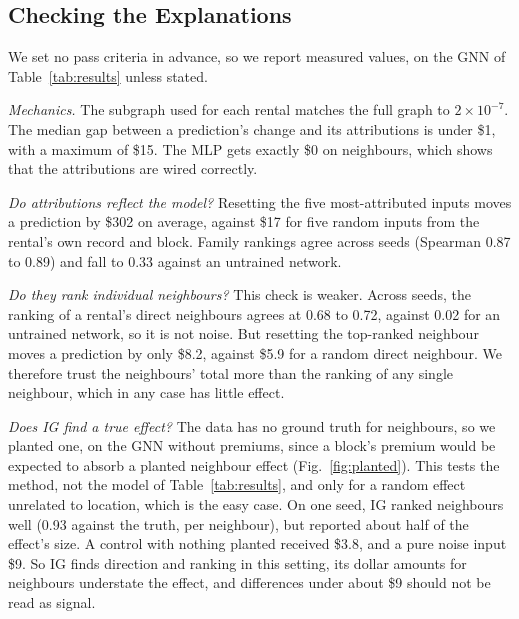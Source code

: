 \subsection{Checking the Explanations}

We set no pass criteria in advance, so we report measured values, on the GNN of Table~\ref{tab:results} unless stated.

\emph{Mechanics.} The subgraph used for each rental matches the full graph to $2\times10^{-7}$. The median gap between a prediction's change and its attributions is under \$1, with a maximum of \$15. The MLP gets exactly \$0 on neighbours, which shows that the attributions are wired correctly.

\emph{Do attributions reflect the model?} Resetting the five most-attributed inputs moves a prediction by \$302 on average, against \$17 for five random inputs from the rental's own record and block. Family rankings agree across seeds (Spearman 0.87 to 0.89) and fall to 0.33 against an untrained network.

\emph{Do they rank individual neighbours?} This check is weaker. Across seeds, the ranking of a rental's direct neighbours agrees at 0.68 to 0.72, against 0.02 for an untrained network, so it is not noise. But resetting the top-ranked neighbour moves a prediction by only \$8.2, against \$5.9 for a random direct neighbour. We therefore trust the neighbours' total more than the ranking of any single neighbour, which in any case has little effect.

\emph{Does IG find a true effect?} The data has no ground truth for neighbours, so we planted one, on the GNN without premiums, since a block's premium would be expected to absorb a planted neighbour effect (Fig.~\ref{fig:planted}). This tests the method, not the model of Table~\ref{tab:results}, and only for a random effect unrelated to location, which is the easy case. On one seed, IG ranked neighbours well (0.93 against the truth, per neighbour), but reported about half of the effect's size. A control with nothing planted received \$3.8, and a pure noise input \$9. So IG finds direction and ranking in this setting, its dollar amounts for neighbours understate the effect, and differences under about \$9 should not be read as signal.


